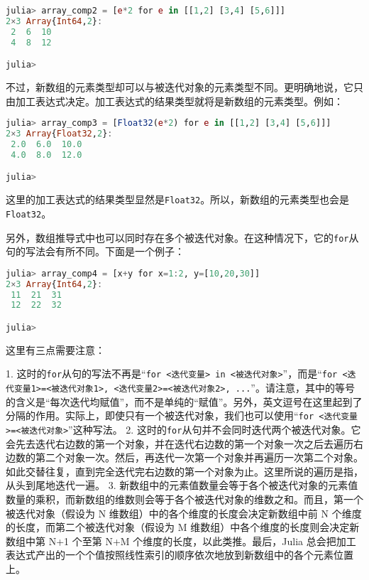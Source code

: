 \begin{lstlisting}[language=julia]
julia> array_comp2 = [e*2 for e in [[1,2] [3,4] [5,6]]]
2×3 Array{Int64,2}:
 2  6  10
 4  8  12

julia> 
\end{lstlisting}

不过，新数组的元素类型却可以与被迭代对象的元素类型不同。更明确地说，它只由加工表达式决定。加工表达式的结果类型就将是新数组的元素类型。例如：

\begin{lstlisting}[language=julia]
julia> array_comp3 = [Float32(e*2) for e in [[1,2] [3,4] [5,6]]]
2×3 Array{Float32,2}:
 2.0  6.0  10.0
 4.0  8.0  12.0

julia> 
\end{lstlisting}

这里的加工表达式的结果类型显然是\verb|Float32|。所以，新数组的元素类型也会是\verb|Float32|。

另外，数组推导式中也可以同时存在多个被迭代对象。在这种情况下，它的\verb|for|从句的写法会有所不同。下面是一个例子：

\begin{lstlisting}[language=julia]
julia> array_comp4 = [x+y for x=1:2, y=[10,20,30]]
2×3 Array{Int64,2}:
 11  21  31
 12  22  32

julia> 
\end{lstlisting}

这里有三点需要注意：

1. 这时的\verb|for|从句的写法不再是“\verb|for <迭代变量> in <被迭代对象>|”，而是“\verb|for <迭代变量1>=<被迭代对象1>, <迭代变量2>=<被迭代对象2>, ...|”。请注意，其中的等号的含义是“每次迭代均赋值”，而不是单纯的“赋值”。另外，英文逗号在这里起到了分隔的作用。实际上，即使只有一个被迭代对象，我们也可以使用“\verb|for <迭代变量>=<被迭代对象>|”这种写法。
2. 这时的\verb|for|从句并不会同时迭代两个被迭代对象。它会先去迭代右边数的第一个对象，并在迭代右边数的第一个对象一次之后去遍历右边数的第二个对象一次。然后，再迭代一次第一个对象并再遍历一次第二个对象。如此交替往复，直到完全迭代完右边数的第一个对象为止。这里所说的遍历是指，从头到尾地迭代一遍。
3. 新数组中的元素值数量会等于各个被迭代对象的元素值数量的乘积，而新数组的维数则会等于各个被迭代对象的维数之和。而且，第一个被迭代对象（假设为 N 维数组）中的各个维度的长度会决定新数组中前 N 个维度的长度，而第二个被迭代对象（假设为 M 维数组）中各个维度的长度则会决定新数组中第 N+1 个至第 N+M 个维度的长度，以此类推。最后，Julia 总会把加工表达式产出的一个个值按照线性索引的顺序依次地放到新数组中的各个元素位置上。

